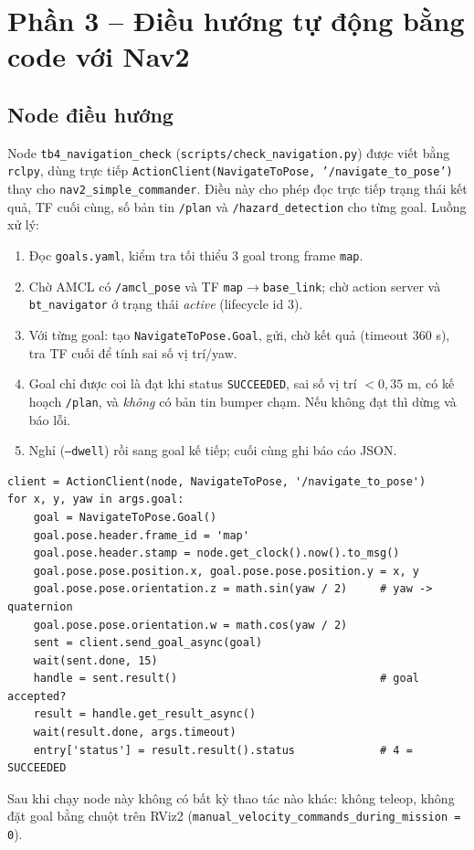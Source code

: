 \documentclass[a4paper,12pt]{article}
\begin{document}
\section{Phần 3 -- Điều hướng tự động bằng code với Nav2}
\subsection{Node điều hướng}
Node \texttt{tb4\_navigation\_check} (\texttt{scripts/check\_navigation.py}) được viết bằng \texttt{rclpy}, dùng trực tiếp \texttt{ActionClient(NavigateToPose, '/navigate\_to\_pose')} thay cho \texttt{nav2\_simple\_commander}. Điều này cho phép đọc trực tiếp trạng thái kết quả, TF cuối cùng, số bản tin \texttt{/plan} và \texttt{/hazard\_detection} cho từng goal. Luồng xử lý:
\begin{enumerate}[nosep]
  \item Đọc \texttt{goals.yaml}, kiểm tra tối thiểu 3 goal trong frame \texttt{map}.
  \item Chờ AMCL có \texttt{/amcl\_pose} và TF \texttt{map}$\to$\texttt{base\_link}; chờ action server và \texttt{bt\_navigator} ở trạng thái \emph{active} (lifecycle id 3).
  \item Với từng goal: tạo \texttt{NavigateToPose.Goal}, gửi, chờ kết quả (timeout 360 s), tra TF cuối để tính sai số vị trí/yaw.
  \item Goal chỉ được coi là đạt khi status \texttt{SUCCEEDED}, sai số vị trí $<0{,}35$ m, có kế hoạch \texttt{/plan}, và \emph{không} có bản tin bumper chạm. Nếu không đạt thì dừng và báo lỗi.
  \item Nghỉ (\texttt{--dwell}) rồi sang goal kế tiếp; cuối cùng ghi báo cáo JSON.
\end{enumerate}
\begin{lstlisting}
client = ActionClient(node, NavigateToPose, '/navigate_to_pose')
for x, y, yaw in args.goal:
    goal = NavigateToPose.Goal()
    goal.pose.header.frame_id = 'map'
    goal.pose.header.stamp = node.get_clock().now().to_msg()
    goal.pose.pose.position.x, goal.pose.pose.position.y = x, y
    goal.pose.pose.orientation.z = math.sin(yaw / 2)     # yaw -> quaternion
    goal.pose.pose.orientation.w = math.cos(yaw / 2)
    sent = client.send_goal_async(goal)
    wait(sent.done, 15)
    handle = sent.result()                               # goal accepted?
    result = handle.get_result_async()
    wait(result.done, args.timeout)
    entry['status'] = result.result().status             # 4 = SUCCEEDED
\end{lstlisting}
Sau khi chạy node này không có bất kỳ thao tác nào khác: không teleop, không đặt goal bằng chuột trên RViz2 (\texttt{manual\_velocity\_commands\_during\_mission = 0}).
\end{document}
